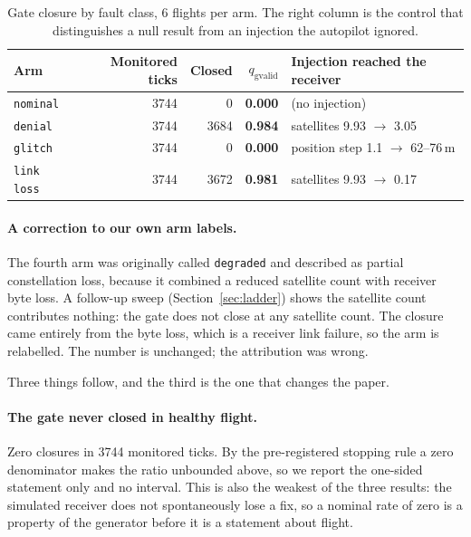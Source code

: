 \documentclass[11pt,a4paper]{article}
\newcommand{\code}[1]{\texttt{\small #1}}
\begin{document}
\begin{table}[h]
\centering
\small
\begin{tabular}{lrrrl}
\toprule
Arm & Monitored ticks & Closed & $q_{\mathrm{gvalid}}$ & Injection reached the
receiver \\
\midrule
\code{nominal}  & 3744 & 0    & \textbf{0.000} & (no injection) \\
\code{denial}   & 3744 & 3684 & \textbf{0.984} & satellites 9.93 $\to$ 3.05 \\
\code{glitch}   & 3744 & 0    & \textbf{0.000} & position step 1.1 $\to$
62--76\,m \\
\code{link loss} & 3744 & 3672 & \textbf{0.981} & satellites 9.93 $\to$ 0.17 \\
\bottomrule
\end{tabular}
\caption{Gate closure by fault class, 6 flights per arm. The right column is
the control that distinguishes a null result from an injection the autopilot
ignored.}
\label{tab:qgvalid}
\end{table}

\paragraph{A correction to our own arm labels.} The fourth arm was originally
called \code{degraded} and described as partial constellation loss, because it
combined a reduced satellite count with receiver byte loss. A follow-up sweep
(Section~\ref{sec:ladder}) shows the satellite count contributes nothing: the
gate does not close at any satellite count. The closure came entirely from the
byte loss, which is a receiver link failure, so the arm is relabelled. The
number is unchanged; the attribution was wrong.

Three things follow, and the third is the one that changes the paper.

\paragraph{The gate never closed in healthy flight.} Zero closures in 3744
monitored ticks. By the pre-registered stopping rule a zero denominator makes
the ratio unbounded above, so we report the one-sided statement only and no
interval. This is also the weakest of the three results: the simulated receiver
does not spontaneously lose a fix, so a nominal rate of zero is a property of
the generator before it is a statement about flight.
\end{document}
